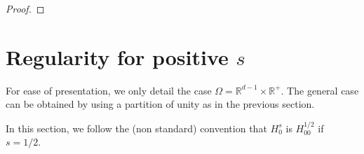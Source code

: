 \documentclass[10pt]{amsart}
\theoremstyle{definition}\newtheorem{defi}[theo]{Definition}\newtheorem{rema}[theo]{Remark}\newtheorem{exam}[theo]{Example}\newtheorem{exem}[theo]{Example}\newtheorem{nota}[theo]{Notation}
\newcommand{\R}{\mathbb{R}}
\begin{document}
\begin{proof}
%

\end{proof}

\section{Regularity for positive $s$}\label{sect5}
For ease of presentation, we only detail the case $\Omega =\R^{d-1}\times \R^+$. The general case can be obtained by using a partition of unity as in the previous section. 


In this section, we follow the (non standard) convention that $H^s_0$ is $H^{1/2}_{00}$ if $s=1/2$.
\end{document}
